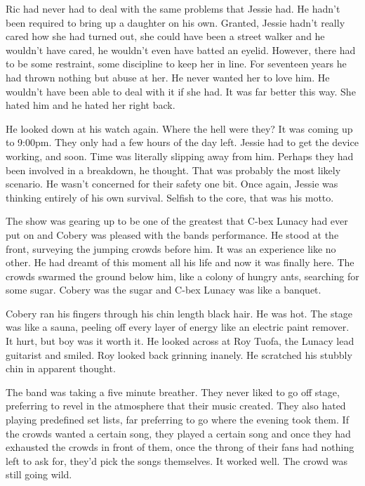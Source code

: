 Ric had never had to deal with the same problems that Jessie had.  He hadn't been required to bring up a daughter on his own.  Granted, Jessie hadn't really cared how she had turned out, she could have been a street walker and he wouldn't have cared, he wouldn't even have batted an eyelid.  However, there had to be some restraint, some discipline to keep her in line.  For seventeen years he had thrown nothing but abuse at her.  He never wanted her to love him.  He wouldn't have been able to deal with it if she had.  It was far better this way.  She hated him and he hated her right back.

He looked down at his watch again.  Where the hell were they?  It was coming up to 9:00pm.  They only had a few hours of the day left.  Jessie had to get the device working, and soon.  Time was literally slipping away from him.  Perhaps they had been involved in a breakdown, he thought.  That was probably the most likely scenario.  He wasn't concerned for their safety one bit.  Once again, Jessie was thinking entirely of his own survival.  Selfish to the core, that was his motto.  



\thoughtbreak



The show was gearing up to be one of the greatest that C-bex Lunacy had ever put on and Cobery was pleased with the bands performance.  He stood at the front, surveying the jumping crowds before him.  It was an experience like no other.  He had dreamt of this moment all his life and now it was finally here.  The crowds swarmed the ground below him, like a colony of hungry ants, searching for some sugar.  Cobery was the sugar and C-bex Lunacy was like a banquet.

Cobery ran his fingers through his chin length black hair.  He was hot.  The stage was like a sauna, peeling off every layer of energy like an electric paint remover.  It hurt, but boy was it worth it.  He looked across at Roy Tuofa, the Lunacy lead guitarist and smiled.  Roy looked back grinning inanely.  He scratched his stubbly chin in apparent thought.  

The band was taking a five minute breather.  They never liked to go off stage, preferring to revel in the atmosphere that their music created.  They also hated playing predefined set lists, far preferring to go where the evening took them.  If the crowds wanted a certain song, they played a certain song and once they had exhausted the crowds in front of them, once the throng of their fans had nothing left to ask for, they'd pick the songs themselves.  It worked well.  The crowd was still going wild.  

